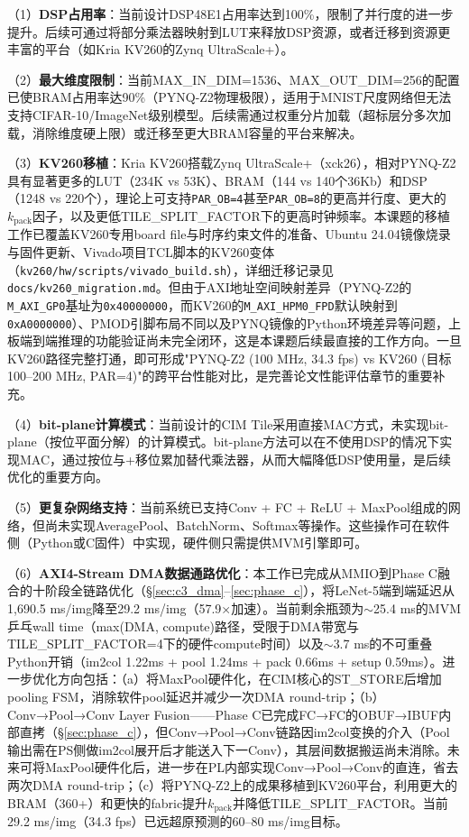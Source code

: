 \documentclass[12pt, a4paper]{article}
\begin{document}
（1）\textbf{DSP占用率}：当前设计DSP48E1占用率达到100\%，限制了并行度的进一步提升。后续可通过将部分乘法器映射到LUT来释放DSP资源，或者迁移到资源更丰富的平台（如Kria KV260的Zynq UltraScale+）。

（2）\textbf{最大维度限制}：当前MAX\_IN\_DIM=1536、MAX\_OUT\_DIM=256的配置已使BRAM占用率达90\%（PYNQ-Z2物理极限），适用于MNIST尺度网络但无法支持CIFAR-10/ImageNet级别模型。后续需通过权重分片加载（超标层分多次加载，消除维度硬上限）或迁移至更大BRAM容量的平台来解决。

（3）\textbf{KV260移植}：Kria KV260搭载Zynq UltraScale+（xck26），相对PYNQ-Z2具有显著更多的LUT（234K vs 53K）、BRAM（144 vs 140个36Kb）和DSP（1248 vs 220个），理论上可支持\texttt{PAR\_OB=4}甚至\texttt{PAR\_OB=8}的更高并行度、更大的$k_{\text{pack}}$因子，以及更低TILE\_SPLIT\_FACTOR下的更高时钟频率。本课题的移植工作已覆盖KV260专用board file与时序约束文件的准备、Ubuntu 24.04镜像烧录与固件更新、Vivado项目TCL脚本的KV260变体（\texttt{kv260/hw/scripts/vivado\_build.sh}），详细迁移记录见\texttt{docs/kv260\_migration.md}。但由于AXI地址空间映射差异（PYNQ-Z2的\texttt{M\_AXI\_GP0}基址为\texttt{0x40000000}，而KV260的\texttt{M\_AXI\_HPM0\_FPD}默认映射到\texttt{0xA0000000}）、PMOD引脚布局不同以及PYNQ镜像的Python环境差异等问题，上板端到端推理的功能验证尚未完全闭环，这是本课题后续最直接的工作方向。一旦KV260路径完整打通，即可形成"PYNQ-Z2 (100 MHz, 34.3 fps) vs KV260 (目标100--200 MHz, PAR=4)"的跨平台性能对比，是完善论文性能评估章节的重要补充。

（4）\textbf{bit-plane计算模式}：当前设计的CIM Tile采用直接MAC方式，未实现bit-plane（按位平面分解）的计算模式。bit-plane方法可以在不使用DSP的情况下实现MAC，通过按位与+移位累加替代乘法器，从而大幅降低DSP使用量，是后续优化的重要方向。

（5）\textbf{更复杂网络支持}：当前系统已支持Conv + FC + ReLU + MaxPool组成的网络，但尚未实现AveragePool、BatchNorm、Softmax等操作。这些操作可在软件侧（Python或C固件）中实现，硬件侧只需提供MVM引擎即可。

（6）\textbf{AXI4-Stream DMA数据通路优化}：本工作已完成从MMIO到Phase C融合的十阶段全链路优化（§\ref{sec:c3_dma}--\ref{sec:phase_c}），将LeNet-5端到端延迟从1,690.5 ms/img降至29.2 ms/img（57.9×加速）。当前剩余瓶颈为$\sim$25.4 ms的MVM乒乓wall time（max(DMA, compute)路径，受限于DMA带宽与TILE\_SPLIT\_FACTOR=4下的硬件compute时间）以及$\sim$3.7 ms的不可重叠Python开销（im2col 1.22ms + pool 1.24ms + pack 0.66ms + setup 0.59ms）。进一步优化方向包括：（a）将MaxPool硬件化，在CIM核心的ST\_STORE后增加pooling FSM，消除软件pool延迟并减少一次DMA round-trip；（b）Conv→Pool→Conv Layer Fusion——Phase C已完成FC→FC的OBUF→IBUF内部直拷（§\ref{sec:phase_c}），但Conv→Pool→Conv链路因im2col变换的介入（Pool输出需在PS侧做im2col展开后才能送入下一Conv），其层间数据搬运尚未消除。未来可将MaxPool硬件化后，进一步在PL内部实现Conv→Pool→Conv的直连，省去两次DMA round-trip；（c）将PYNQ-Z2上的成果移植到KV260平台，利用更大的BRAM（360+）和更快的fabric提升$k_{\text{pack}}$并降低TILE\_SPLIT\_FACTOR。当前29.2 ms/img（34.3 fps）已远超原预测的60--80 ms/img目标。
\end{document}
